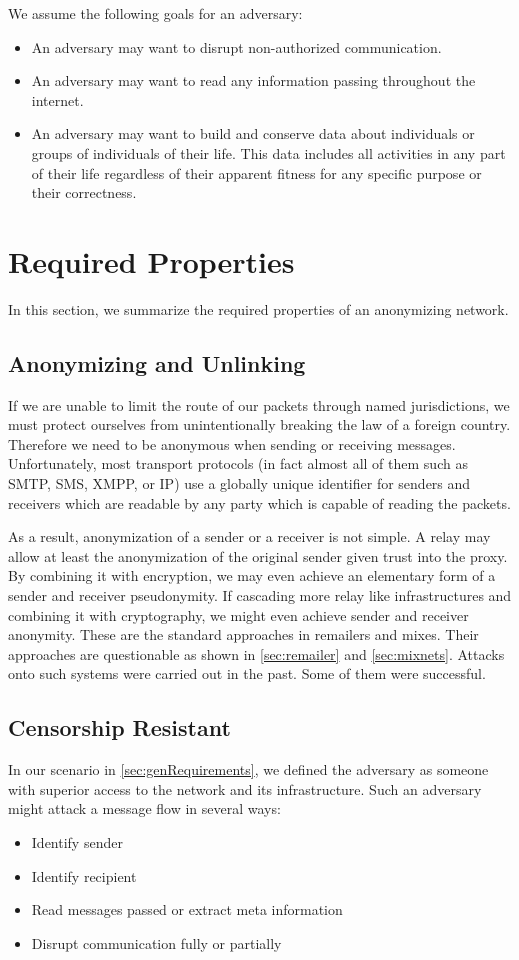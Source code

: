 We assume the following goals for an adversary:
\begin{itemize}
	\item An adversary may want to disrupt non-authorized communication.
	\item An adversary may want to read any information passing throughout the internet.
	\item  An adversary may want to build and conserve data about individuals or groups of individuals of their life. This data includes all activities in any part of their life regardless of their apparent fitness for any specific purpose or their correctness.
\end{itemize}

\section{Required Properties}
In this section, we summarize the required properties of an anonymizing network.

\subsection{Anonymizing and Unlinking}
If we are unable to limit the route of our packets through named jurisdictions, we must protect ourselves from unintentionally breaking the law of a foreign country. Therefore we need to be anonymous when sending or receiving messages. Unfortunately, most transport protocols (in fact almost all of them such as SMTP, SMS, XMPP, or IP) use a globally unique identifier for senders and receivers which are readable by any party which is capable of reading the packets. 

As a result, anonymization of a sender or a receiver is not simple. A relay may allow at least the anonymization of the original sender given trust into the proxy. By combining it with encryption, we may even achieve an elementary form of a sender and receiver pseudonymity. If cascading more relay like infrastructures and combining it with cryptography, we might even achieve sender and receiver anonymity. These are the standard approaches in remailers and mixes. Their approaches are questionable as shown in \ref{sec:remailer} and \ref{sec:mixnets}. Attacks onto such systems were carried out in the past. Some of them were successful.

\subsection{Censorship Resistant}
In our scenario in \ref{sec:genRequirements}, we defined the adversary as someone with superior access to the network and its infrastructure. Such an adversary might attack a message flow in several ways:
\begin{itemize}
	\item Identify sender
	\item Identify recipient
	\item Read messages passed or extract meta information
	\item Disrupt communication fully or partially
\end{itemize}

